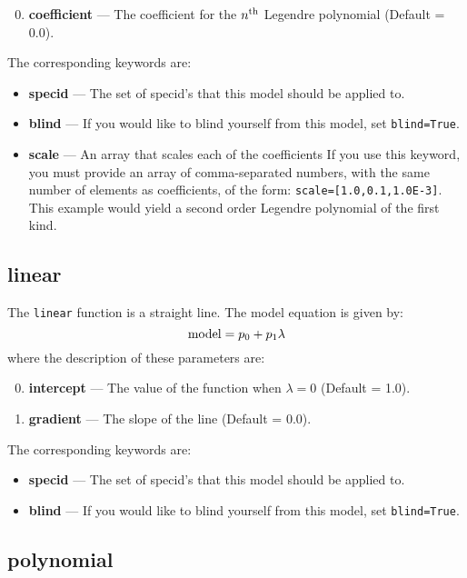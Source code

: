 \begin{enumerate}
\setcounter{enumi}{-1}
\item \textbf{coefficient} --- The coefficient for the $n^{\rm th}$ Legendre polynomial (Default = 0.0).
\end{enumerate}

The corresponding keywords are:

\begin{itemize}
\item \textbf{specid} --- The set of specid's that this model should be applied to.
\item \textbf{blind} --- If you would like to blind yourself from this model, set \texttt{blind=True}.
\item \textbf{scale} --- An array that scales each of the coefficients If you use this keyword, you
must provide an array  of comma-separated numbers, with the same number of elements as
coefficients, of the form: \texttt{scale=[1.0,0.1,1.0E-3]}. This example would yield a second
order Legendre polynomial of the first kind.
\end{itemize}


\subsection{linear}

The \texttt{linear} function is a straight line. The model equation is given by:
\begin{equation}
{\rm model}=p_0 + p_1 \lambda
\end{equation}
where the description of these parameters are:
\begin{enumerate}
\setcounter{enumi}{-1}
\item \textbf{intercept} --- The value of the function when $\lambda=0$ (Default = 1.0).
\item \textbf{gradient} --- The slope of the line (Default = 0.0).
\end{enumerate}
The corresponding keywords are:
\begin{itemize}
\item \textbf{specid} --- The set of specid's that this model should be applied to.
\item \textbf{blind} --- If you would like to blind yourself from this model, set \texttt{blind=True}.
\end{itemize}


\subsection{polynomial}

